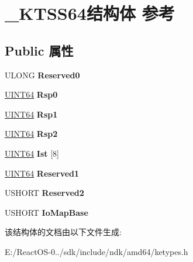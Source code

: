 \hypertarget{struct___k_t_s_s64}{}\section{\+\_\+\+K\+T\+S\+S64结构体 参考}
\label{struct___k_t_s_s64}
\subsection*{Public 属性}
\begin{DoxyCompactItemize}
\item 
\mbox{\label{struct___k_t_s_s64_a77074651cce222208ffb72a87ac22925}} 
U\+L\+O\+NG {\bfseries Reserved0}
\item 
\mbox{\label{struct___k_t_s_s64_a8caa74d2bef685d63e282c8fab95f733}} 
\hyperlink{_processor_bind_8h_a57be03562867144161c1bfee95ca8f7c}{U\+I\+N\+T64} {\bfseries Rsp0}
\item 
\mbox{\label{struct___k_t_s_s64_a5324c23fe7036db1d063fa0990f72b79}} 
\hyperlink{_processor_bind_8h_a57be03562867144161c1bfee95ca8f7c}{U\+I\+N\+T64} {\bfseries Rsp1}
\item 
\mbox{\label{struct___k_t_s_s64_a6659c58570377ccb66c0909088feb80e}} 
\hyperlink{_processor_bind_8h_a57be03562867144161c1bfee95ca8f7c}{U\+I\+N\+T64} {\bfseries Rsp2}
\item 
\mbox{\label{struct___k_t_s_s64_a34cc17722452a1aa180c4ea030ccb277}} 
\hyperlink{_processor_bind_8h_a57be03562867144161c1bfee95ca8f7c}{U\+I\+N\+T64} {\bfseries Ist} \mbox{[}8\mbox{]}
\item 
\mbox{\label{struct___k_t_s_s64_a80119959a4183510ddc368cc2558b7da}} 
\hyperlink{_processor_bind_8h_a57be03562867144161c1bfee95ca8f7c}{U\+I\+N\+T64} {\bfseries Reserved1}
\item 
\mbox{\label{struct___k_t_s_s64_a49abbba3ca0bf11ad9d481b28fc54814}} 
U\+S\+H\+O\+RT {\bfseries Reserved2}
\item 
\mbox{\label{struct___k_t_s_s64_a382e179a235d855f2a2761ecb9d652be}} 
U\+S\+H\+O\+RT {\bfseries Io\+Map\+Base}
\end{DoxyCompactItemize}


该结构体的文档由以下文件生成\+:\begin{DoxyCompactItemize}
\item 
E\+:/\+React\+O\+S-\/0../sdk/include/ndk/amd64/ketypes.\+h\end{DoxyCompactItemize}
